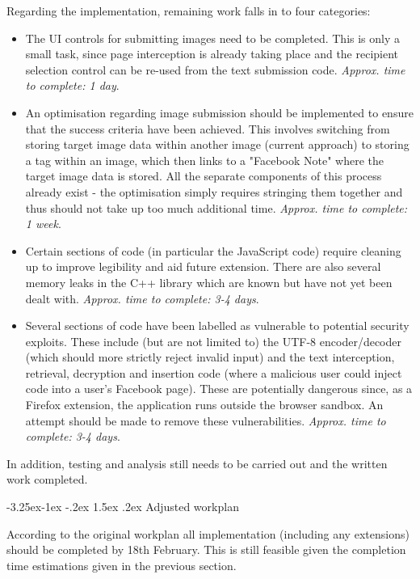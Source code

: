 \documentclass[a4paper,12pt]{article}
\makeatletter
\renewcommand\paragraph{\@startsection{paragraph}{4}{\z@}%
  {-3.25ex\@plus -1ex \@minus -.2ex}%
  {1.5ex \@plus .2ex}%
  {\normalfont\normalsize\bfseries}}
\makeatother
\begin{document}
Regarding the implementation, remaining work falls in to four categories:
\begin{itemize}
	\item The UI controls for submitting images need to be completed. This is only a small task, since page interception is already taking place and the recipient selection control can be re-used from the text submission code. \textit{Approx. time to complete: 1 day}.
	
	\item An optimisation regarding image submission should be implemented to ensure that the success criteria have been achieved. This involves switching from storing target image data within another image (current approach) to storing a tag within an image, which then links to a "Facebook Note" where the target image data is stored. All the separate components of this process already exist - the optimisation simply requires stringing them together and thus should not take up too much additional time. \textit{Approx. time to complete: 1 week}.
	
	\item Certain sections of code (in particular the JavaScript code) require cleaning up to improve legibility and aid future extension. There are also several memory leaks in the C++ library which are known but have not yet been dealt with. \textit{Approx. time to complete: 3-4 days}.
	
	\item Several sections of code have been labelled as vulnerable to potential security exploits. These include (but are not limited to) the UTF-8 encoder/decoder (which should more strictly reject invalid input) and the text interception, retrieval, decryption and insertion code (where a malicious user could inject code into a user's Facebook page). These are potentially dangerous since, as a Firefox extension, the application runs outside the browser sandbox. An attempt should be made to remove these vulnerabilities. \textit{Approx. time to complete: 3-4 days}.
\end{itemize}
In addition, testing and analysis still needs to be carried out and the written work completed.

\paragraph{Adjusted workplan}

According to the original workplan all implementation (including any extensions) should be completed by 18th February. This is still feasible given the completion time estimations given in the previous section.
\end{document}
